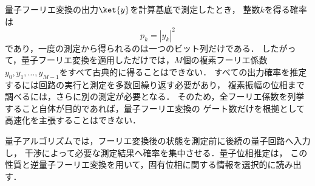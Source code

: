 量子フーリエ変換の出力$\ket{y}$を計算基底で測定したとき，
整数$k$を得る確率は
\begin{equation}
  p_k
  =
  |y_k|^2
  \label{eq:qft-measurement-probability}
\end{equation}
であり，一度の測定から得られるのは一つのビット列だけである．
したがって，量子フーリエ変換を適用しただけでは，$M$個の複素フーリエ係数
$y_0,y_1,\ldots,y_{M-1}$をすべて古典的に得ることはできない．
すべての出力確率を推定するには回路の実行と測定を多数回繰り返す必要があり，
複素振幅の位相まで調べるには，さらに別の測定が必要となる．
そのため，全フーリエ係数を列挙すること自体が目的であれば，量子フーリエ変換の
ゲート数だけを根拠として高速化を主張することはできない．

量子アルゴリズムでは，フーリエ変換後の状態を測定前に後続の量子回路へ入力し，
干渉によって必要な測定結果へ確率を集中させる．量子位相推定は，
この性質と逆量子フーリエ変換を用いて，固有位相に関する情報を選択的に読み出す．

